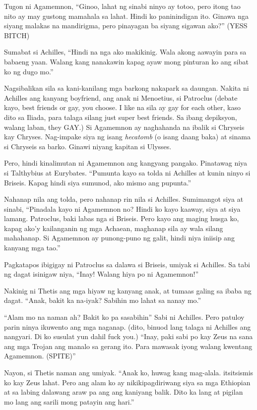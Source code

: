 \documentclass[12pt,letterpaper]{report}
\begin{document}
Tugon ni Agamemnon, ``Ginoo, lahat ng sinabi ninyo ay totoo, pero itong tao nito ay may gustong mamahala sa lahat. Hindi ko paninindigan ito. Ginawa nga siyang malakas na mandirigma, pero pinayagan ba siyang sigawan ako?'' (YESS BITCH)

Sumabat si Achilles, ``Hindi na nga ako makikinig. Wala akong aawayin para sa babaeng yaan. Walang kang nanakawin kapag ayaw mong pinturan ko ang sibat ko ng dugo mo.''

Nagsibalikan sila sa kani-kanilang mga barkong nakapark sa daungan. Nakita ni Achilles ang kanyang boyfriend, ang anak ni Menoetius, si Patroclus (debate kayo, best friends or gay, you choose. I like na sila ay gay for each other, kaso dito sa Iliada, para talaga silang just super best friends. Sa ibang depiksyon, walang laban, they GAY.) Si Agamemnon ay naghahanda na ibalik si Chryseis kay Chryses. Nag-impake siya ng isang \textit{hecatomb} (o isang daang baka) at sinama si Chryseis sa barko. Ginawi niyang kapitan si Ulysses.

Pero, hindi kinalimutan ni Agamemnon ang kangyang pangako. Pinatawag niya si Talthybius at Eurybates. ``Pumunta kayo sa tolda ni Achilles at kunin ninyo si Briseis. Kapag hindi siya sumunod, ako mismo ang pupunta.''

Nahanap nila ang tolda, pero nahanap rin nila si Achilles. Sumimangot siya at sinabi, ``Pinadala kayo ni Agamemnon no? Hindi ko kayo kaaway, siya at siya lamang. Patroclus, baki labas nga si Briseis. Pero kayo ang maging husga ko, kapag ako'y kailanganin ng mga Achaean, maghanap sila ay wala silang mahahanap. Si Agamemnon ay punong-puno ng galit, hindi niya iniisip ang kanyang mga tao.''

Pagkatapos ibigigay ni Patroclus sa dalawa si Briseis, umiyak si Achilles. Sa tabi ng dagat isinigaw niya, ``Inay! Walang hiya po ni Agamemnon!''

Nakinig ni Thetis ang mga hiyaw ng kanyang anak, at tumaas galing sa ibaba ng dagat. ``Anak, bakit ka na-iyak? Sabihin mo lahat sa nanay mo.''

``Alam mo na naman ah? Bakit ko pa sasabihin'' Sabi ni Achilles. Pero patuloy parin ninya ikuwento ang mga naganap. (dito, binuod lang talaga ni Achilles ang nangyari. Di ko susulat yun dahil fuck you.) ``Inay, paki sabi po kay Zeus na sana ang mga Trojan ang manalo sa gerang ito. Para mawasak iyong walang kwentang Agamemnon. (SPITE)''

Nayon, si Thetis naman ang umiyak. ``Anak ko, huwag kang mag-alala. itsitsismis ko kay Zeus lahat. Pero ang alam ko ay nikikipagdiriwang siya sa mga Ethiopian at sa labing dalawang araw pa ang ang kaniyang balik. Dito ka lang at pigilan mo lang ang sarili mong patayin ang hari.''
\end{document}
